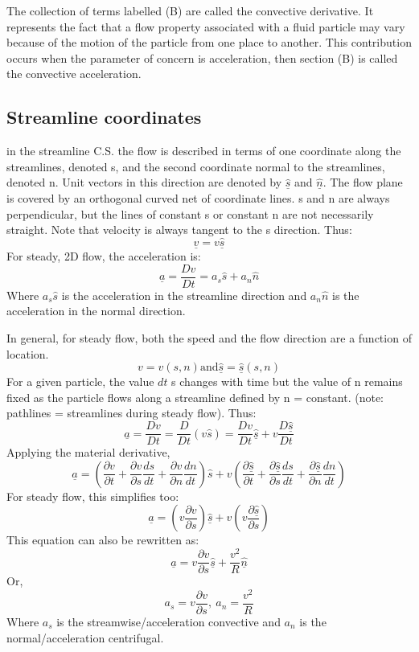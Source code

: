 \documentclass[class=report, crop=false, 12pt,a4paper]{standalone}
\begin{document}
The collection of terms labelled (B) are called the convective derivative. It represents the fact that a flow property associated with a fluid particle may vary because of the motion of the particle from one place to another. This contribution occurs when the parameter of concern is acceleration, then section (B) is called the convective acceleration. 
\subsection{Streamline coordinates}
in the streamline C.S. the flow is described in terms of one coordinate along the streamlines, denoted s, and the second coordinate normal to the streamlines, denoted n. Unit vectors in this direction are denoted by \( \underline{\hat{s}} \) and \( \underline{\hat{n}} \). The flow plane is covered by an orthogonal curved net of coordinate lines. s and n are always perpendicular, but the lines of constant s or constant n are not necessarily straight. Note that velocity is always tangent to the s direction. Thus:
\[ \underline{v} = v\underline{\hat{s}} \]
For steady, 2D flow, the acceleration is:
\[ \underline{a} = \frac{Dv}{Dt} = a_s \hat{s} + a_n \hat{n}\]
Where \( a_s \hat{s} \) is the acceleration in the streamline direction and \( a_n \hat{n} \) is the acceleration in the normal direction. 

In general, for steady flow, both the speed and the flow direction are a function of location.
\[ v = v(s, n) \textrm{and} \underline{\hat{s}} = \underline{\hat{s}}(s, n) \]
For a given particle, the value \(dt \) s changes with time but the value of n remains fixed as the particle flows along a streamline defined by n = constant. (note: pathlines = streamlines during steady flow). Thus: 
\[ \underline{a} = \frac{Dv}{Dt} = \frac{D}{Dt}(v\hat{s}) = \frac{Dv}{Dt}\underline{\hat{s}} + v \frac{D\underline{\hat{s}}}{Dt} \]
Applying the material derivative,
\[ \underline{a} = \left( \frac{\partial v}{\partial t} + \frac{\partial v}{\partial s}\frac{ds}{dt} + \frac{\partial v}{\partial n}\frac{dn}{dt} \right) \hat{s} + v \left( \frac{\partial \underline{\hat{s}}}{\partial t} + \frac{\partial \underline{\hat{s}}}{\partial s}\frac{ds}{dt} + \frac{\partial \underline{\hat{s}}}{\partial n}\frac{dn}{dt} \right) \]
For steady flow, this simplifies too:
\[ \underline{a} = \left( v\frac{\partial v}{\partial s} \right) \underline{\hat{s}} + v \left( v\frac{\partial \underline{\hat{s}}}{\partial s} \right) \]
This equation can also be rewritten as:
\[ \underline{a} = v\frac{\partial v}{\partial s} \underline{\hat{s}} + \frac{v^2}{R} \underline{\hat{n}} \]
Or,
\begin{equation} 
  a_s = v\frac{\partial v}{\partial s}, \ a_n = \frac{v^2}{R} 
\end{equation}
Where \(a_s\) is the streamwise/acceleration convective and \(a_n\) is the normal/acceleration centrifugal.
\end{document}
